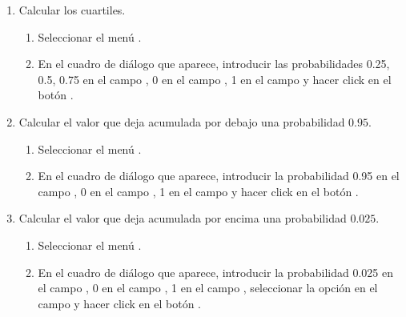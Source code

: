 \begin{enumerate}[leftmargin=*]
\begin{enumerate}
\item Calcular los cuartiles.
\begin{indicacion}{
\begin{enumerate}
\item Seleccionar el menú .
\item En el cuadro de diálogo que aparece, introducir las probabilidades 0.25, 0.5, 0.75 en el campo , 0 en el
campo , 1 en el campo  y hacer click en el botón .
\end{enumerate}}
\end{indicacion}

\item Calcular el valor que deja acumulada por debajo una probabilidad $0.95$.
\begin{indicacion}{
\begin{enumerate}
\item Seleccionar el menú .
\item En el cuadro de diálogo que aparece, introducir la probabilidad 0.95 en el campo , 0 en el
campo , 1 en el campo  y hacer click en el botón .
\end{enumerate}}
\end{indicacion}

\item Calcular el valor que deja acumulada por encima una probabilidad $0.025$.
\begin{indicacion}{
\begin{enumerate}
\item Seleccionar el menú .
\item En el cuadro de diálogo que aparece, introducir la probabilidad 0.025 en el campo , 0
en el campo , 1 en el campo , seleccionar la opción  en el campo
 y hacer click en el botón .
\end{enumerate}}
\end{indicacion}
\end{enumerate}



\end{enumerate}
